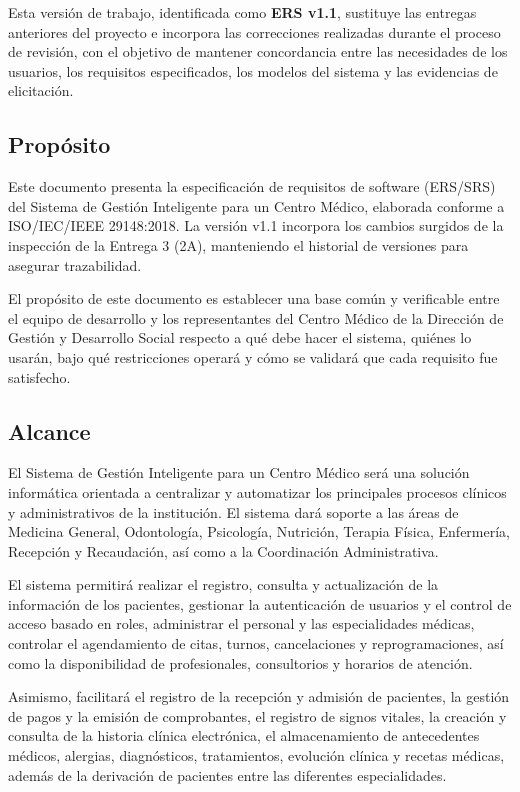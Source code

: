 \documentclass[11pt,a4paper]{article}
\begin{document}
	Esta versión de trabajo, identificada como \textbf{ERS v1.1}, sustituye las entregas anteriores del proyecto e incorpora las
	correcciones realizadas durante el proceso de revisión, con el objetivo de
	mantener concordancia entre las necesidades de los usuarios, los requisitos
	especificados, los modelos del sistema y las evidencias de elicitación.
	
	\subsection{ Propósito}
	
	Este documento presenta la especificación de requisitos de software (ERS/SRS) del Sistema de Gestión Inteligente para un Centro Médico, elaborada conforme a ISO/IEC/IEEE 29148:2018. La versión v1.1 incorpora los cambios surgidos de la inspección de la Entrega 3 (2A), manteniendo el historial de versiones para asegurar trazabilidad.
	
	El propósito de este documento es establecer una base común y verificable entre el equipo de desarrollo y los representantes del Centro Médico de la Dirección de Gestión y Desarrollo Social respecto a qué debe hacer el sistema, quiénes lo usarán, bajo qué restricciones operará y cómo se validará que cada requisito fue satisfecho.
	
	
	\subsection{ Alcance}
	
	El Sistema de Gestión Inteligente para un Centro Médico será una solución informática orientada a centralizar y automatizar los principales procesos clínicos y administrativos de la institución. El sistema dará soporte a las áreas de Medicina General, Odontología, Psicología, Nutrición, Terapia Física, Enfermería, Recepción y Recaudación, así como a la Coordinación Administrativa.
	
	El sistema permitirá realizar el registro, consulta y actualización de la información de los pacientes, gestionar la autenticación de usuarios y el control de acceso basado en roles, administrar el personal y las especialidades médicas, controlar el agendamiento de citas, turnos, cancelaciones y reprogramaciones, así como la disponibilidad de profesionales, consultorios y horarios de atención.
	
	Asimismo, facilitará el registro de la recepción y admisión de pacientes, la gestión de pagos y la emisión de comprobantes, el registro de signos vitales, la creación y consulta de la historia clínica electrónica, el almacenamiento de antecedentes médicos, alergias, diagnósticos, tratamientos, evolución clínica y recetas médicas, además de la derivación de pacientes entre las diferentes especialidades.
	
\end{document}
